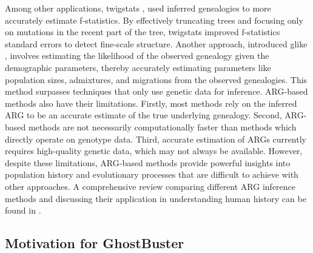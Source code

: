 Among other applications, twigstats \cite{speidel2024high}, used inferred genealogies to more accurately estimate f-statistics. By effectively truncating trees and focusing only on mutations in the recent part of the tree, twigstats improved f-statistics standard errors to detect fine-scale structure. Another approach, introduced glike \cite{fan2023likelihood}, involves estimating the likelihood of the observed genealogy given the demographic parameters, thereby accurately estimating parameters like population sizes, admixtures, and migrations from the observed genealogies. This method surpasses techniques that only use genetic data for inference. ARG-based methods also have their limitations. Firstly, most methods rely on the inferred ARG to be an accurate estimate of the true underlying genealogy. Second, ARG-based methods are not necessarily computationally faster than methods which directly operate on genotype data. Third, accurate estimation of ARGs currently requires high-quality genetic data, which may not always be available. However, despite these limitations, ARG-based methods provide powerful insights into population history and evolutionary processes that are difficult to achieve with other approaches. A comprehensive review comparing different ARG inference methods and discussing their application in understanding human history can be found in \cite{brandt2024promise, nielsen2024inference}.

\subsection{Motivation for GhostBuster}



